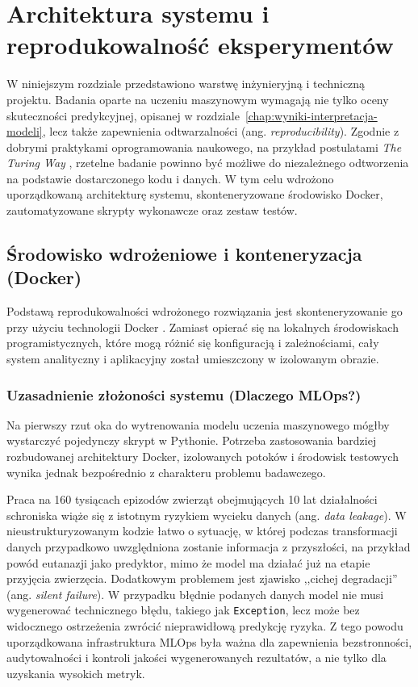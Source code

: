 \chapter{Architektura systemu i reprodukowalność eksperymentów}
\label{chap:architektura-systemu-reprodukowalnosc}

W niniejszym rozdziale przedstawiono warstwę inżynieryjną i techniczną projektu. Badania oparte na uczeniu maszynowym wymagają nie tylko oceny skuteczności predykcyjnej, opisanej w rozdziale~\ref{chap:wyniki-interpretacja-modeli}, lecz także zapewnienia odtwarzalności (ang. \emph{reproducibility}). Zgodnie z dobrymi praktykami oprogramowania naukowego, na przykład postulatami \emph{The Turing Way} \cite{TuringWay2025}, rzetelne badanie powinno być możliwe do niezależnego odtworzenia na podstawie dostarczonego kodu i danych. W tym celu wdrożono uporządkowaną architekturę systemu, skonteneryzowane środowisko Docker, zautomatyzowane skrypty wykonawcze oraz zestaw testów.

\section{Środowisko wdrożeniowe i konteneryzacja (Docker)}
\label{sec:srodowisko-wdrozeniowe-konteneryzacja}

Podstawą reprodukowalności wdrożonego rozwiązania jest skonteneryzowanie go przy użyciu technologii Docker \cite{Merkel2014}. Zamiast opierać się na lokalnych środowiskach programistycznych, które mogą różnić się konfiguracją i zależnościami, cały system analityczny i aplikacyjny został umieszczony w izolowanym obrazie.

\subsection{Uzasadnienie złożoności systemu (Dlaczego MLOps?)}
\label{subsec:uzasadnienie-zlozonosci-systemu-mlops}

Na pierwszy rzut oka do wytrenowania modelu uczenia maszynowego mógłby wystarczyć pojedynczy skrypt w Pythonie. Potrzeba zastosowania bardziej rozbudowanej architektury Docker, izolowanych potoków i środowisk testowych wynika jednak bezpośrednio z charakteru problemu badawczego.

Praca na 160 tysiącach epizodów zwierząt obejmujących 10 lat działalności schroniska wiąże się z istotnym ryzykiem wycieku danych (ang. \emph{data leakage}). W nieustrukturyzowanym kodzie łatwo o sytuację, w której podczas transformacji danych przypadkowo uwzględniona zostanie informacja z przyszłości, na przykład powód eutanazji jako predyktor, mimo że model ma działać już na etapie przyjęcia zwierzęcia. Dodatkowym problemem jest zjawisko ,,cichej degradacji'' (ang. \emph{silent failure}). W przypadku błędnie podanych danych model nie musi wygenerować technicznego błędu, takiego jak \texttt{Exception}, lecz może bez widocznego ostrzeżenia zwrócić nieprawidłową predykcję ryzyka. Z tego powodu uporządkowana infrastruktura MLOps była ważna dla zapewnienia bezstronności, audytowalności i kontroli jakości wygenerowanych rezultatów, a nie tylko dla uzyskania wysokich metryk.

